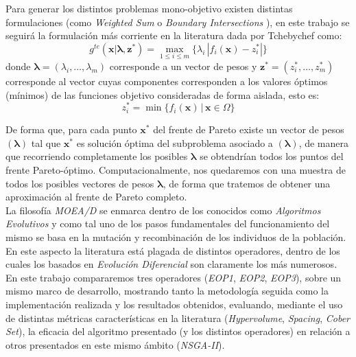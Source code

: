 Para generar los distintos problemas mono-objetivo existen distintas formulaciones (como \textit{Weighted Sum} o \textit{Boundary Intersections} \cite{Zhang2008}), en este trabajo se seguirá la formulación más corriente en la literatura dada por Tchebychef como: $$ g^{te}\left(\boldsymbol{x}|\boldsymbol{\lambda},\boldsymbol{z^{*}}\right) = \max \limits_{1 \leq i \leq m} \{\lambda_i \, \left|f_{i}(\boldsymbol{x}) - z_{i}^{*}\right|\}$$ donde $\boldsymbol{\lambda}=(\lambda_i, \dots, \lambda_m)$ corresponde a un vector de pesos y $\boldsymbol{z^{*}}=(z^{*}_i, \dots, z^{*}_m)$ corresponde al vector cuyas componentes corresponden a los valores óptimos (mínimos) de las funciones objetivo consideradas de forma aislada, esto es: $$ z_i^{*} = \min \{ f_{i}(\boldsymbol{x}) \, | \,  \boldsymbol{x} \in \Omega \}$$

De forma que, para cada punto $\boldsymbol{x}^{*}$ del frente de Pareto existe un vector de pesos $(\boldsymbol{\lambda})$ tal que  $\boldsymbol{x}^{*}$ es solución óptima del subproblema asociado a $(\boldsymbol{\lambda})$, de manera que recorriendo completamente los posibles $\boldsymbol{\lambda}$ se obtendrían todos los puntos del frente Pareto-óptimo. Computacionalmente, nos quedaremos con una muestra de todos los posibles vectores de pesos $\boldsymbol{\lambda}$, de forma que tratemos de obtener una aproximación al frente de Pareto completo.\\


La filosofía \textit{MOEA/D} se enmarca dentro de los conocidos como \textit{Algoritmos Evolutivos} y como tal uno de los pasos fundamentales del funcionamiento del mismo se basa en la mutación y recombinación de los individuos de la población. En este aspecto la literatura está plagada de distintos operadores, dentro de los cuales los basados en \textit{Evolución Diferencial} son claramente los más numerosos. En este trabajo compararemos tres operadores (\textit{EOP1}, \textit{EOP2}, \textit{EOP3}), sobre un mismo marco de desarrollo, mostrando tanto la metodología seguida como la implementación realizada y los resultados obtenidos, evaluando, mediante el uso de distintas métricas características en la literatura (\textit{Hypervolume}, \textit{Spacing}, \textit{Cober Set}), la eficacia del algoritmo presentado (y los distintos operadores) en relación a otros presentados en este mismo ámbito (\textit{NSGA-II}).\\


